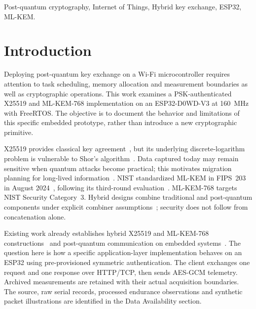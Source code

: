\documentclass[journal, 10pt]{IEEEtran}
\begin{document}
\begin{IEEEkeywords}
Post-quantum cryptography, Internet of Things, Hybrid key exchange, ESP32, ML-KEM.
\end{IEEEkeywords}

\section{Introduction}
Deploying post-quantum key exchange on a Wi-Fi microcontroller requires attention to task scheduling, memory allocation and measurement boundaries as well as cryptographic operations. This work examines a PSK-authenticated X25519 and ML-KEM-768 implementation on an ESP32-D0WD-V3 at 160~MHz with FreeRTOS. The objective is to document the behavior and limitations of this specific embedded prototype, rather than introduce a new cryptographic primitive.

X25519 provides classical key agreement~\cite{b5,b19}, but its underlying discrete-logarithm problem is vulnerable to Shor's algorithm~\cite{b1,b27}. Data captured today may remain sensitive when quantum attacks become practical; this motivates migration planning for long-lived information~\cite{b10,b39}. NIST standardized ML-KEM in FIPS~203 in August 2024~\cite{b2}, following its third-round evaluation~\cite{b15}. ML-KEM-768 targets NIST Security Category~3. Hybrid designs combine traditional and post-quantum components under explicit combiner assumptions~\cite{b8,b9}; security does not follow from concatenation alone.

Existing work already establishes hybrid X25519 and ML-KEM-768 constructions~\cite{b41} and post-quantum communication on embedded systems~\cite{b11,b42}. The question here is how a specific application-layer implementation behaves on an ESP32 using pre-provisioned symmetric authentication. The client exchanges one request and one response over HTTP/TCP, then sends AES-GCM telemetry. Archived measurements are retained with their actual acquisition boundaries. The source, raw serial records, processed endurance observations and synthetic packet illustrations are identified in the Data Availability section.
\end{document}
